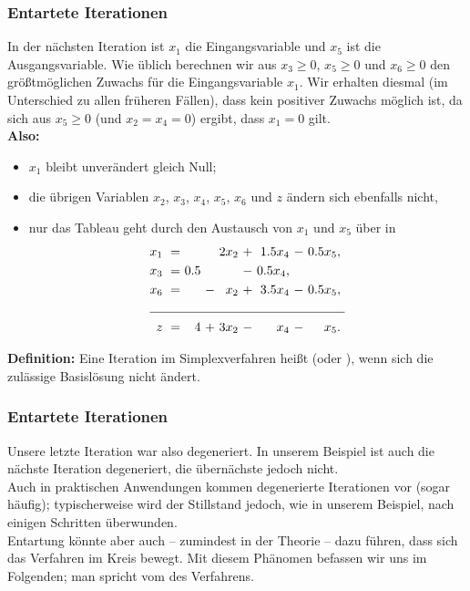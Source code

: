 \documentclass[smaller]{beamer}
\begin{document}
\begin{frame}
 \frametitle{Entartete Iterationen}
 In der nächsten Iteration ist $x_1$ die Eingangsvariable und $x_5$ ist die Ausgangsvariable. Wie üblich berechnen wir aus $x_3 \geq 0$, $x_5 \geq 0$ und $x_6 \geq 0$ den größtmöglichen Zuwachs für die Eingangsvariable $x_1$. Wir erhalten diesmal (im Unterschied zu allen früheren Fällen), dass kein positiver Zuwachs möglich ist, da sich aus $x_5 \geq 0$ (und $x_2=x_4=0$) ergibt, dass $x_1=0$ gilt. \\
\vspace*{0.2cm}
\textbf{Also:} 
\begin{itemize}
\item $x_1$ bleibt unverändert gleich Null; 
\item die übrigen Variablen $x_2$, $x_3$, $x_4$, $x_5$, $x_6$ und $z$ ändern sich ebenfalls nicht, 
\item nur das Tableau geht durch den Austausch von $x_1$ und $x_5$ über in
\begin{align*}
\begin{alignedat}{5}
x_1 &\ = &\     &\   &\ 2x_2 &\ + &\ 1.5x_4 &\ - &\ 0.5x_5,\ \\
x_3 &\ = &\ 0.5 &\   &\      &\ - &\ 0.5x_4, &\   &\         \\ 
x_6 &\ = &\     &\ - &\  x_2 &\ + &\ 3.5x_4 &\ - &\ 0.5x_5,\ \\ \cline{1-9}
z   &\ = &\   4 &\ + &\ 3x_2 &\ - &\    x_4 &\ - &\    x_5.\
\end{alignedat}
\end{align*}
\end{itemize}
\textbf{Definition:} Eine Iteration im Simplexverfahren heißt  (oder ), wenn sich die zulässige Basislösung nicht ändert. 
\end{frame}

\begin{frame}
 \frametitle{Entartete Iterationen}
 Unsere letzte Iteration war also degeneriert. In unserem Beispiel ist auch die nächste Iteration degeneriert, die übernächste jedoch nicht.\\
 \vspace*{0.2cm}
\alert{Auch in praktischen Anwendungen kommen degenerierte Iterationen vor (sogar häufig); typischerweise wird der Stillstand jedoch, wie in unserem Beispiel, nach einigen Schritten überwunden}.\\
\vspace*{0.2cm}
Entartung könnte aber auch -- zumindest in der Theorie -- dazu führen, dass sich das Verfahren im Kreis bewegt. Mit diesem Phänomen befassen wir uns im Folgenden; man spricht vom  des Verfahrens.
\end{frame}
\end{document}

